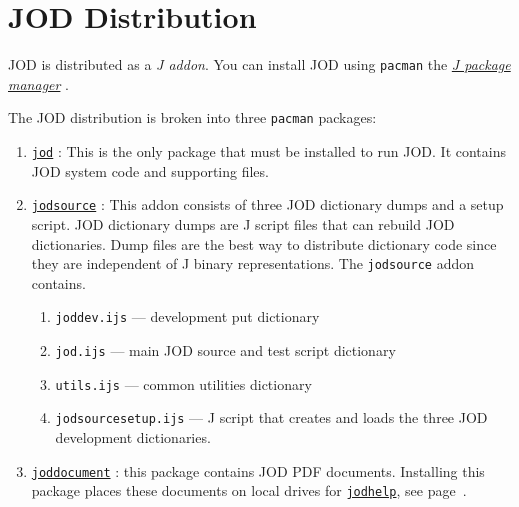 
\appendix

    \newpage
    \section{JOD Distribution}
   
   
   JOD is distributed as a \emph{J addon}.  
   You can install JOD using \texttt{pacman} the  
   \href{https://code.jsoftware.com/wiki/Pacman}{\emph{J package manager}} \cite{jwiki:jal}.
   
   
   The JOD distribution is broken into three \texttt{pacman} packages:
   \begin{enumerate}
	\item  \href{https://www.jsoftware.com/jwiki/Addons/general/jod}{\texttt{jod}} 
	\cite{baker:jod}:  This is the only package that must be installed to run JOD.  
	It contains  JOD system code and supporting files.
	\item  \href{https://www.jsoftware.com/jwiki/Addons/general/jodsource}{\texttt{jodsource}}
	 \cite{baker:jodsource}: This addon consists of three 
	   JOD dictionary dumps and a setup script.  JOD dictionary dumps
	  are J script files that can rebuild  JOD dictionaries.  Dump files are the best way to
	  distribute dictionary code since they are independent of J binary representations. 
	  The \texttt{jodsource} addon contains.
  \begin{enumerate}
	  \item \texttt{joddev.ijs} --- development put dictionary
	  \item \texttt{jod.ijs} --- main JOD source and test script dictionary
	  \item \texttt{utils.ijs}  --- common utilities dictionary
     \item \texttt{jodsourcesetup.ijs} --- J script that creates and loads the three
     JOD development dictionaries.
  \end{enumerate}
  \item \href{https://www.jsoftware.com/jwiki/Addons/general/joddocument}{\texttt{joddocument}} \cite{baker:joddocument}: this package contains 
  JOD PDF documents. Installing this
  package places these documents on local drives 
  for \hyperlink{il:jodhelp}{\texttt{jodhelp}}, see page~\pageref{ss:jodhelp}.  
\end{enumerate}

